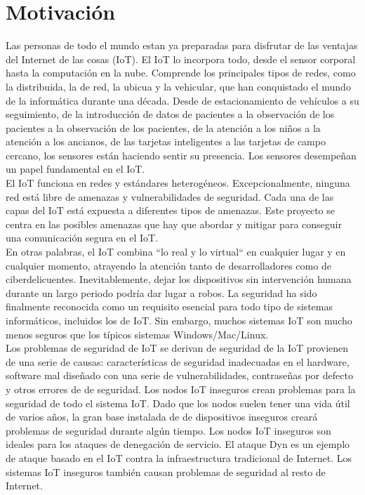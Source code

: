 \section{Motivación} \label{motivacion}

Las personas de todo el mundo estan ya preparadas para disfrutar de las ventajas del Internet de las cosas (IoT). El IoT lo incorpora todo, desde el sensor corporal hasta la computación en la nube. Comprende los principales tipos de redes, como la distribuida, la de red, la ubicua y la vehicular, que han conquistado el mundo de la informática durante una década. Desde de estacionamiento de vehículos a su seguimiento, de la introducción de datos de pacientes a la observación de los pacientes a la observación de los pacientes, de la atención a los niños a la atención a los ancianos, de las tarjetas inteligentes a las tarjetas de campo cercano, los sensores están haciendo sentir su presencia. Los sensores desempeñan un papel fundamental en el IoT.\\

El IoT funciona en redes y estándares heterogéneos. Excepcionalmente, ninguna red está libre de amenazas y vulnerabilidades de seguridad. Cada una de las capas del IoT está expuesta a diferentes tipos de amenazas. Este proyecto se centra en las posibles amenazas que hay que abordar y mitigar para conseguir una comunicación segura en el IoT. \cite{hanes2017iot} \\

En otras palabras, el IoT combina ``lo real y lo virtual`` en cualquier lugar y en cualquier momento, atrayendo la atención tanto de desarrolladores como de ciberdelicuentes. Inevitablemente, dejar los dispositivos sin intervención humana durante un largo periodo podría dar lugar a robos. La seguridad ha sido finalmente reconocida como un requisito esencial para todo tipo de sistemas informáticos, incluidos los de IoT. Sin embargo, muchos sistemas IoT son mucho menos seguros que los típicos sistemas Windows/Mac/Linux. \\

Los problemas de seguridad de IoT se derivan de seguridad de la IoT provienen de una serie de causas: características de seguridad inadecuadas en el hardware, software mal diseñado con una serie de vulnerabilidades, contraseñas por defecto y otros errores de de seguridad. Los nodos IoT inseguros crean problemas para la seguridad de todo el sistema IoT. Dado que los nodos suelen tener una vida útil de varios años, la gran base instalada de de dispositivos inseguros creará problemas de seguridad durante algún tiempo. Los nodos IoT inseguros son ideales para los ataques de denegación de servicio. El ataque Dyn es un ejemplo de ataque basado en el IoT contra la infraestructura tradicional de Internet. Los sistemas IoT inseguros también causan problemas de seguridad al resto de Internet. \\

